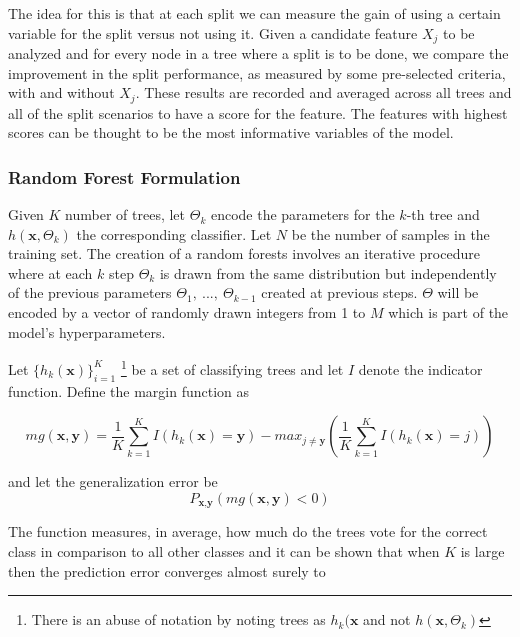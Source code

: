 The idea for this is that at each split we can measure the gain of using a certain variable for the split versus not using it. Given a candidate feature $X_j$ to be analyzed and for every node in a tree where a split is to be done, we compare the improvement in the split performance, as measured by some pre-selected criteria, with and without $X_j$. These results are recorded and averaged across all trees and all of the split scenarios to have a score for the feature. The features with highest scores can be thought to be the most informative variables of the model.



\subsubsection{Random Forest Formulation}
Given $K$ number of trees, let $\Theta_k$ encode the parameters for the $k$-th tree and $h(\textbf{x},\Theta_k)$ the corresponding classifier. Let $N$ be the number of samples in the training set. The creation of a random forests involves an iterative procedure where at each $k$ step $\Theta_k$ is drawn from the same distribution but independently of the previous parameters $\Theta_1, \ ..., \ \Theta_{k-1}$ created at previous steps. $\Theta$ will be encoded by a vector of randomly drawn integers from 1 to $M$ which is part of the model's hyperparameters.


Let $\{h_k(\textbf{x})\}_{i=1}^K$  \footnote{There is an abuse of notation by noting trees as $h_k(\textbf{x}$ and not $h(\textbf{x}, \Theta_k)$ } be a set of classifying trees and let $I$ denote the indicator function.  Define the margin function as

\begin{equation}
mg(\textbf{x},\textbf{y}) =  \frac{1}{K}   \sum_{k=1}^K I(h_k(\textbf{x}) = \textbf{y})
- max_{j\neq \textbf{y}}\left(\frac{1}{K} \sum_{k=1}^K I(h_k(\textbf{x}) = j) \right) 
\end{equation} \label{eq:rf-marginFun}


and let the generalization error be
\begin{equation}
 P_{\textbf{x}, \textbf{y} }(mg(\textbf{x}, \textbf{y}) < 0)
 \end{equation}


The function measures, in average, how much do the trees vote for the correct class in comparison to all other classes and it can be shown that when $K$ is large then the prediction error converges almost surely to

